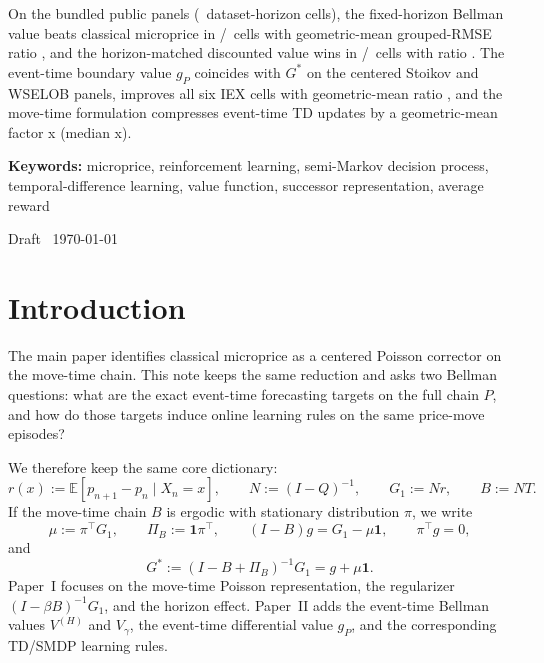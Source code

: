 \documentclass[11pt,twoside]{article}
\theoremstyle{plain}
\theoremstyle{definition}
\theoremstyle{remark}
\newcommand{\1}{\mathbf{1}}
\newcommand{\E}{\mathbb{E}}
\newcommand{\PiB}{\Pi_B}
\begin{document}
\begin{titlepage}
\begin{minipage}{0.86\textwidth}
On the bundled public panels (\RLEmpiricalCellCount\ dataset-horizon cells), the fixed-horizon Bellman value beats classical microprice in \RLEmpiricalFiniteWins/\RLEmpiricalCellCount\ cells with geometric-mean grouped-RMSE ratio \RLEmpiricalFiniteGeo, and the horizon-matched discounted value wins in \RLEmpiricalDiscountWins/\RLEmpiricalCellCount\ cells with ratio \RLEmpiricalDiscountGeo. The event-time boundary value $g_P$ coincides with $G^*$ on the centered Stoikov and WSELOB panels, improves all six IEX cells with geometric-mean ratio \RLEmpiricalDiffIEXGeo, and the move-time formulation compresses event-time TD updates by a geometric-mean factor \RLEmpiricalMoveCompressionGeo{}x (median \RLEmpiricalMoveCompressionMedian{}x).

\vspace{0.9em}
\noindent\textbf{Keywords:} microprice, reinforcement learning, semi-Markov decision process, temporal-difference learning, value function, successor representation, average reward
\end{minipage}

\vfill

{\small\color{sectioncolor} Draft \textbullet\ \today}

\end{titlepage}

\section{Introduction}

The main paper \cite{Petersen2025} identifies classical microprice as a centered Poisson corrector on the move-time chain. This note keeps the same reduction and asks two Bellman questions: what are the exact event-time forecasting targets on the full chain $P$, and how do those targets induce online learning rules on the same price-move episodes?

We therefore keep the same core dictionary:
\[
r(x):=\E[p_{n+1}-p_n\mid X_n=x],
\qquad
N:=(I-Q)^{-1},
\qquad
G_1:=Nr,
\qquad
B:=NT.
\]
If the move-time chain $B$ is ergodic with stationary distribution $\pi$, we write
\[
\mu:=\pi^\top G_1,
\qquad
\PiB:=\1\pi^\top,
\qquad
(I-B)g=G_1-\mu\1,
\qquad
\pi^\top g=0,
\]
and
\[
G^*:=(I-B+\PiB)^{-1}G_1=g+\mu\1.
\]
Paper~I focuses on the move-time Poisson representation, the regularizer $(I-\beta B)^{-1}G_1$, and the horizon effect. Paper~II adds the event-time Bellman values $V^{(H)}$ and $V_\gamma$, the event-time differential value $g_P$, and the corresponding TD/SMDP learning rules.
\end{document}
